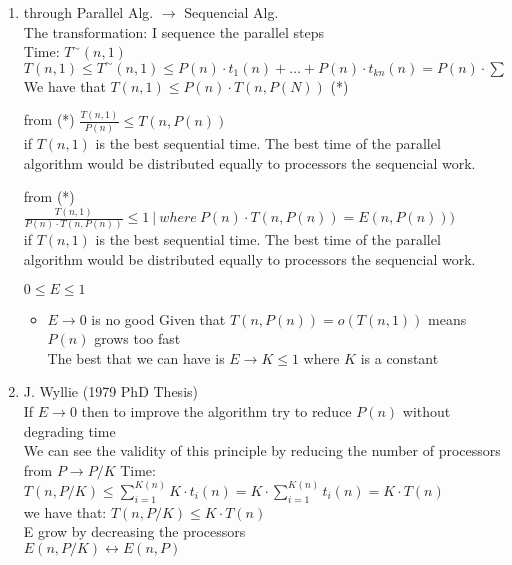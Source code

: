 \begin{enumerate}
 \item through Parallel Alg. $\rightarrow$ Sequencial Alg.\\
 The transformation: I sequence the parallel steps\\
 Time: $T^{\sim}(n,1)$\\
 $T(n,1) \leq T^{\sim}(n,1) \leq P(n) \cdot t_1(n) + \dots + P(n) \cdot t_{kn}(n) = P(n) \cdot \sum$\\
 We have that $T(n, 1) \leq P(n) \cdot T(n, P(N))$ (*)
 \begin{remark}
  from (*) $\frac{T(n,1)}{P(n)} \leq T(n, P(n))$\\
  if $T(n,1)$ is the best sequential time. The best time of the parallel algorithm would be distributed equally to processors the sequencial work.
 \end{remark}
 \begin{remark}
  from (*) $\frac{T(n,1)}{P(n) \cdot T(n,P(n))} \leq 1 \ | \ where \ P(n) \cdot T(n,P(n)) = E(n,P(n)))$\\
  if $T(n,1)$ is the best sequential time. The best time of the parallel algorithm would be distributed equally to processors the sequencial work.
 \end{remark}
 $0 \leq E \leq 1$
 \begin{itemize}
  \item $E \rightarrow 0$ is no good
  Given that $T(n,P(n)) = o(T(n,1))$ means $P(n)$ grows too fast\\
  The best that we can have is $E \rightarrow K \leq 1$ where $K$ is a constant
 \end{itemize}  
 \item J. Wyllie (1979 PhD Thesis)\\
 If $E \rightarrow 0$ then to improve the algorithm try to reduce $P(n)$ without degrading time\\
 We can see the validity of this principle by reducing the number of processors from $P \rightarrow P/K$
 Time:\\
 $T(n,P/K) \leq \sum_{i=1}^{K(n)}K \cdot t_i(n) = K \cdot \sum_{i=1}^{K(n)} t_i(n) = K \cdot T(n)$\\
 we have that: $T(n,P/K) \leq K \cdot T(n)$\\
 E grow by decreasing the processors\\
 $E(n, P/K) \leftrightarrow E(n,P)$              
\end{enumerate}

